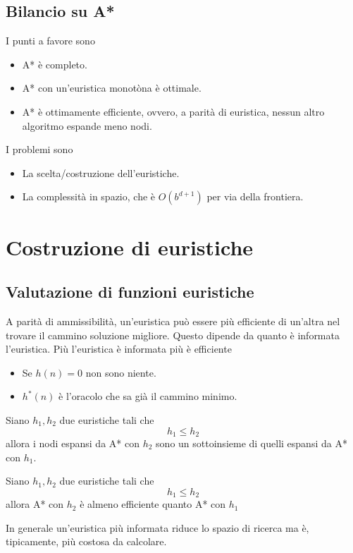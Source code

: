 \subsection{Bilancio su A*}
I punti a favore sono
\begin{itemize}
	\item A* \`e completo.
	\item A* con un'euristica monot\`ona \`e ottimale.
	\item A* \`e ottimamente efficiente, ovvero, a parit\`a di euristica, nessun altro algoritmo
	      espande meno nodi.
\end{itemize}
I problemi sono
\begin{itemize}
	\item La scelta/costruzione dell'euristiche.
	\item La complessit\`a in spazio, che \`e $O(b^{d+1})$ per via della frontiera.
\end{itemize}

\section{Costruzione di euristiche}
\subsection{Valutazione di funzioni euristiche}
A parit\`a di ammissibilit\`a, un'euristica pu\`o essere pi\`u efficiente di un'altra nel trovare
il cammino soluzione migliore. Questo dipende da quanto \`e informata l'euristica.
Pi\`u l'euristica \`e informata pi\`u \`e efficiente
\begin{itemize}
	\item Se $h(n) = 0$ non sono niente.
	\item $h^*(n)$ \`e l'oracolo che sa gi\`a il cammino minimo.
\end{itemize}

\begin{theorem}
	Siano $h_1, h_2$ due euristiche tali che \[ h_1 \leq h_2 \] allora i nodi espansi da A*
	con $h_2$ sono un sottoinsieme di quelli espansi da A* con $h_1$.
\end{theorem}

\begin{theorem}
	Siano $h_1, h_2$ due euristiche tali che \[ h_1 \leq h_2 \] allora A* con $h_2$ \`e almeno
	efficiente quanto A* con $h_1$
\end{theorem}
In generale un'euristica pi\`u informata riduce lo spazio di ricerca ma \`e, tipicamente, pi\`u
costosa da calcolare.

